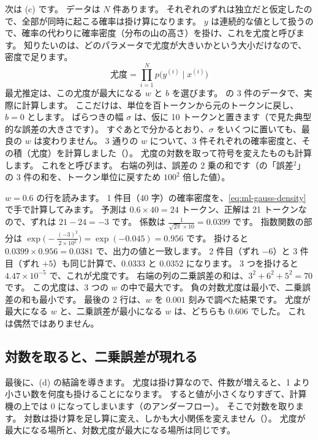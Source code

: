 次は (c) です。
データは $N$ 件あります。
それぞれのずれは独立だと仮定したので、全部が同時に起こる確率は掛け算になります。
$y$ は連続的な値として扱うので、確率の代わりに確率密度（分布の山の高さ）を掛け、これを尤度と呼びます。
知りたいのは、どのパラメータで尤度が大きいかという大小だけなので、密度で足ります。
\begin{equation}
\text{尤度} = \prod_{i=1}^{N} p\bigl(y^{(i)} \mid x^{(i)}\bigr)
\label{eq:ml-likelihood}
\end{equation}
最尤推定は、この尤度が最大になる $w$ と $b$ を選びます。
の 3 件のデータで、実際に計算します。
ここだけは、単位を百トークンから元のトークンに戻し、$b=0$ とします。
ばらつきの幅 $\sigma$ は、仮に 10 トークンと置きます（で見た典型的な誤差の大きさです）。
すぐあとで分かるとおり、$\sigma$ をいくつに置いても、最良の $w$ は変わりません。
3 通りの $w$ について、3 件それぞれの確率密度と、その積（尤度）を計算しました（）。
尤度の対数を取って符号を変えたものも計算します。
これをと呼びます。
右端の列は、誤差の 2 乗の和です（の「誤差$^2$」の 3 件の和を、トークン単位に戻すため $100^2$ 倍した値）。


$w=0.6$ の行を読みます。
1 件目（40 字）の確率密度を、\eqref{eq:ml-gauss-density}で手で計算してみます。
予測は $0.6\times40=24$ トークン、正解は 21 トークンなので、ずれは $21-24=-3$ です。
係数は $\frac{1}{\sqrt{2\pi}\times10}=0.0399$ です。
指数関数の部分は $\exp\bigl(-\frac{(-3)^2}{2\times10^2}\bigr)=\exp(-0.045)=0.956$ です。
掛けると $0.0399\times0.956=0.0381$ で、出力の値と一致します。
2 件目（ずれ $-6$）と 3 件目（ずれ $+5$）も同じ計算で、$0.0333$ と $0.0352$ になります。
3 つを掛けると $4.47\times10^{-5}$ で、これが尤度です。
右端の列の二乗誤差の和は、$3^2+6^2+5^2=70$ です。
この尤度は、3 つの $w$ の中で最大です。
負の対数尤度は最小で、二乗誤差の和も最小です。
最後の 2 行は、$w$ を $0.001$ 刻みで調べた結果です。
尤度が最大になる $w$ と、二乗誤差が最小になる $w$ は、どちらも $0.606$ でした。
これは偶然ではありません。

\subsection*{対数を取ると、二乗誤差が現れる}

最後に、(d) の結論を導きます。
尤度は掛け算なので、件数が増えると、1 より小さい数を何度も掛けることになります。
すると値が小さくなりすぎて、計算機の上では 0 になってしまいます（のアンダーフロー）。
そこで対数を取ります。
対数は掛け算を足し算に変え、しかも大小関係を変えません（）。
尤度が最大になる場所と、対数尤度が最大になる場所は同じです。

